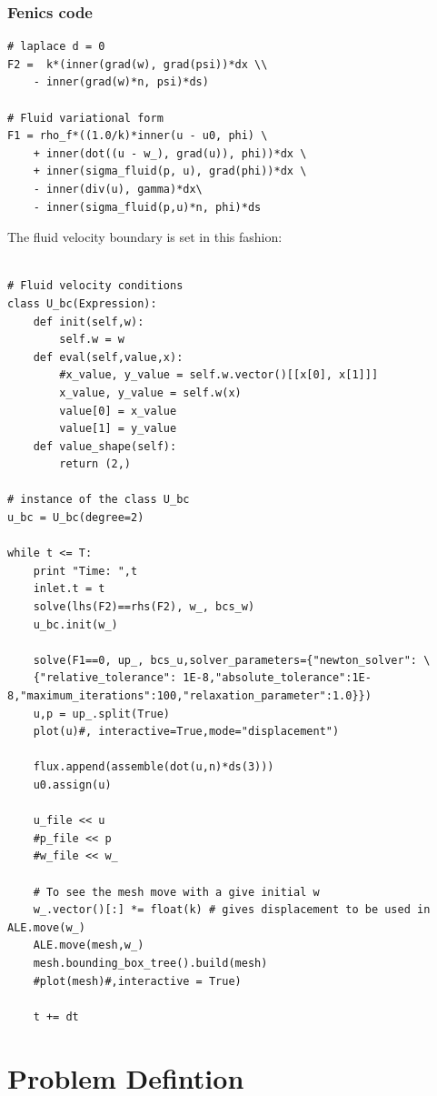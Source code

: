 \subsubsection{Fenics code}
\begin{lstlisting}[frame=single]
# laplace d = 0
F2 =  k*(inner(grad(w), grad(psi))*dx \\
    - inner(grad(w)*n, psi)*ds)

# Fluid variational form
F1 = rho_f*((1.0/k)*inner(u - u0, phi) \
    + inner(dot((u - w_), grad(u)), phi))*dx \
    + inner(sigma_fluid(p, u), grad(phi))*dx \
    - inner(div(u), gamma)*dx\
    - inner(sigma_fluid(p,u)*n, phi)*ds
\end{lstlisting}
The fluid velocity boundary is set in this fashion:
\begin{lstlisting}[frame=single]

# Fluid velocity conditions
class U_bc(Expression):
    def init(self,w):
        self.w = w
    def eval(self,value,x):
        #x_value, y_value = self.w.vector()[[x[0], x[1]]]
        x_value, y_value = self.w(x)
        value[0] = x_value
        value[1] = y_value
    def value_shape(self):
        return (2,)
      
# instance of the class U_bc      
u_bc = U_bc(degree=2)

while t <= T:
    print "Time: ",t
    inlet.t = t
    solve(lhs(F2)==rhs(F2), w_, bcs_w)
    u_bc.init(w_)

    solve(F1==0, up_, bcs_u,solver_parameters={"newton_solver": \
    {"relative_tolerance": 1E-8,"absolute_tolerance":1E-8,"maximum_iterations":100,"relaxation_parameter":1.0}})
    u,p = up_.split(True)
    plot(u)#, interactive=True,mode="displacement")

    flux.append(assemble(dot(u,n)*ds(3)))
    u0.assign(u)

    u_file << u
    #p_file << p
    #w_file << w_

    # To see the mesh move with a give initial w
    w_.vector()[:] *= float(k) # gives displacement to be used in ALE.move(w_)
    ALE.move(mesh,w_)
    mesh.bounding_box_tree().build(mesh)
    #plot(mesh)#,interactive = True)

    t += dt

\end{lstlisting}


\newpage

\section*{Problem Defintion}
